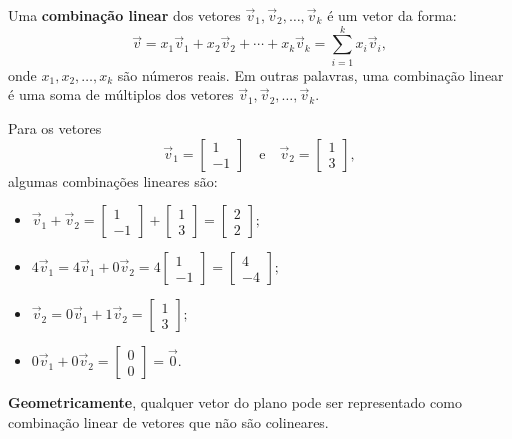 \documentclass[../livro.tex]{subfiles}  %
\begin{document}
Uma \textbf{combinação linear} dos vetores $\vec{v}_1, \vec{v}_2, \dots, \vec{v}_k$ é um vetor da forma:
\begin{equation}
\vec{v} = x_1 \vec{v}_1 + x_2 \vec{v}_2 + \cdots + x_k \vec{v}_k = \sum_{i=1}^k x_i \vec{v}_i,
\end{equation} onde $x_1, x_2, \dots, x_k$ são números reais. Em outras palavras, uma combinação linear é uma soma de múltiplos dos vetores $\vec{v}_1, \vec{v}_2, \dots, \vec{v}_k$.


\begin{example}
Para os vetores
\begin{equation}
\vec{v}_1 = \left[
  \begin{array}{c}
    1 \\
    -1
  \end{array}
\right] \quad \text{e} \quad
\vec{v}_2 = \left[
  \begin{array}{c}
    1 \\
    3
  \end{array}
\right],
\end{equation} algumas combinações lineares são:
\begin{itemize}
  \item $\vec{v}_1 + \vec{v}_2 =
  \left[
  \begin{array}{c}
    1 \\
    -1
  \end{array}
\right] +
\left[
  \begin{array}{c}
    1 \\
    3
  \end{array}
\right] =
\left[
  \begin{array}{c}
    2 \\
    2
  \end{array}
\right];$
  \item $ 4 \vec{v}_1 = 4 \vec{v}_1 + 0 \vec{v}_2 =
  4 \left[
  \begin{array}{c}
    1 \\
    -1
  \end{array}
\right] =
\left[
  \begin{array}{c}
    4 \\
    -4
  \end{array}
\right];$
  \item $ \vec{v}_2 = 0\vec{v}_1 + 1\vec{v}_2 =
   \left[
  \begin{array}{c}
    1 \\
    3
  \end{array}
\right];$
  \item $0\vec{v}_1 + 0 \vec{v}_2 =
  \left[
  \begin{array}{c}
    0 \\
    0
  \end{array}
\right] = \vec{0}.$
\end{itemize} \textbf{Geometricamente}, qualquer vetor do plano pode ser representado como combinação linear de vetores que não são colineares.


\end{example}
\end{document}
